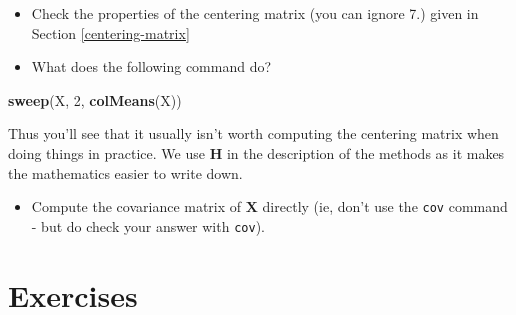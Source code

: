\documentclass[]{book}
\newenvironment{Shaded}{\begin{snugshade}}{\end{snugshade}}
\newcommand{\DecValTok}[1]{\textcolor[rgb]{0.00,0.00,0.81}{#1}}
\newcommand{\KeywordTok}[1]{\textcolor[rgb]{0.13,0.29,0.53}{\textbf{#1}}}
\newcommand{\NormalTok}[1]{#1}
\providecommand{\tightlist}{%
  \setlength{\itemsep}{0pt}\setlength{\parskip}{0pt}}
\theoremstyle{definition}
\theoremstyle{definition}
\theoremstyle{definition}
\theoremstyle{remark}
\begin{document}
\begin{itemize}
\item
  Check the properties of the centering matrix (you can ignore 7.) given in Section \ref{centering-matrix}
\item
  What does the following command do?
\end{itemize}

\begin{Shaded}
\begin{Highlighting}[]
\KeywordTok{sweep}\NormalTok{(X, }\DecValTok{2}\NormalTok{, }\KeywordTok{colMeans}\NormalTok{(X))}
\end{Highlighting}
\end{Shaded}

Thus you'll see that it usually isn't worth computing the centering matrix when doing things in practice. We use \(\boldsymbol H\) in the description of the methods as it makes the mathematics easier to write down.

\begin{itemize}
\tightlist
\item
  Compute the covariance matrix of \(\boldsymbol X\) directly (ie, don't use the \texttt{cov} command - but do check your answer with \texttt{cov}).
\end{itemize}

\hypertarget{exercises-ch2}{%
\section{Exercises}\label{exercises-ch2}}
\end{document}

